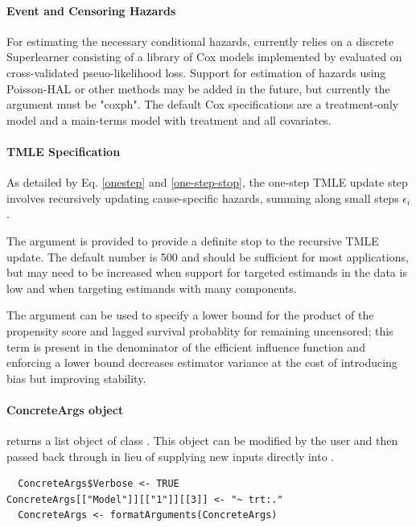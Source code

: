 \documentclass{report}
\newcommand{\1}{\ensuremath{\mathbf{1}}}
\begin{document}
\paragraph{Event and Censoring Hazards}
\label{HazardEstimation}
For estimating the necessary conditional hazards,  currently relies on a discrete Superlearner consisting of a library of Cox models implemented by  evaluated on cross-validated pseuo-likelihood loss. Support for estimation of hazards using Poisson-HAL or other methods may be added in the future, but currently the  argument must be "coxph". The default Cox specifications are a treatment-only model and a main-terms model with treatment and all covariates. 

\paragraph{TMLE Specification}
\label{tmle-specification}
As detailed by Eq. \eqref{onestep} and \eqref{one-step-stop}, the one-step TMLE update step involves recursively updating cause-specific hazards, summing along small steps \(\epsilon_i\). 

The  argument is provided to provide a definite stop to the recursive TMLE update. The default number is 500 and should be sufficient for most applications, but may need to be increased when support for targeted estimands in the data is low and when targeting estimands with many components.

The argument  can be used to specify a lower bound for the product of the propensity score and lagged survival probablity for remaining uncensored; this term is present in the denominator of the efficient influence function and enforcing a lower bound decreases estimator variance at the cost of introducing bias but improving stability.

\paragraph{ConcreteArgs object}
\label{concreteargs}
 returns a list object of class . This object can be modified by the user and then passed back through  in lieu of supplying new inputs directly into .

\begin{lstlisting}
  ConcreteArgs$Verbose <- TRUE
ConcreteArgs[["Model"]][["1"]][[3]] <- "~ trt:."
  ConcreteArgs <- formatArguments(ConcreteArgs)
\end{lstlisting}
\end{document}
